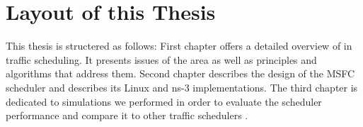 \section*{Layout of this Thesis}
This thesis is structered as follows:  First chapter offers  a detailed overview of   in traffic scheduling. It presents issues of the area as well as principles and algorithms that address them.  Second chapter describes the design of the MSFC scheduler   and describes its Linux and ns-3 implementations. The third chapter is dedicated  to simulations we performed in order to evaluate the scheduler performance and compare it to other traffic schedulers .


